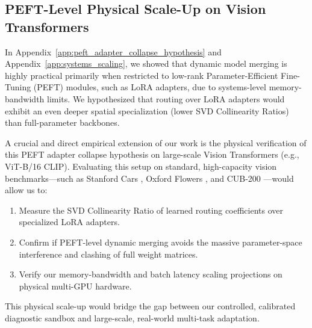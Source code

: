 \subsection{PEFT-Level Physical Scale-Up on Vision Transformers}

In Appendix~\ref{app:peft_adapter_collapse_hypothesis} and Appendix~\ref{app:systems_scaling}, we showed that dynamic model merging is highly practical primarily when restricted to low-rank Parameter-Efficient Fine-Tuning (PEFT) modules, such as LoRA adapters, due to systems-level memory-bandwidth limits. We hypothesized that routing over LoRA adapters would exhibit an even deeper spatial specialization (lower SVD Collinearity Ratios) than full-parameter backbones.

A crucial and direct empirical extension of our work is the physical verification of this PEFT adapter collapse hypothesis on large-scale Vision Transformers (e.g., ViT-B/16 CLIP). Evaluating this setup on standard, high-capacity vision benchmarks---such as Stanford Cars \cite{krause20133d}, Oxford Flowers \cite{nilsback2008automated}, and CUB-200 \cite{wah2011caltech}---would allow us to:
\begin{enumerate}
    \item Measure the SVD Collinearity Ratio of learned routing coefficients over specialized LoRA adapters.
    \item Confirm if PEFT-level dynamic merging avoids the massive parameter-space interference and clashing of full weight matrices.
    \item Verify our memory-bandwidth and batch latency scaling projections on physical multi-GPU hardware.
\end{enumerate}
This physical scale-up would bridge the gap between our controlled, calibrated diagnostic sandbox and large-scale, real-world multi-task adaptation.
